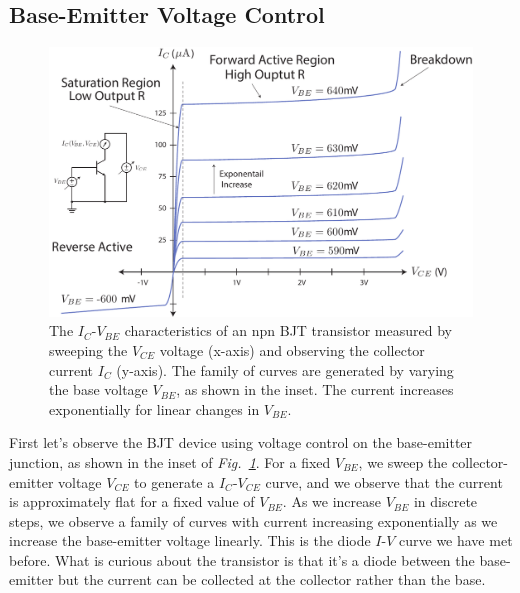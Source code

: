 \subsection{Base-Emitter Voltage Control}
\begin{figure}[tb]
\centering
\includegraphics[width=\columnwidth]{slide8_bjt_ic_vs_ve_curves}
\caption{The $I_C$-$V_{BE}$ characteristics of an npn BJT transistor measured by sweeping the $V_{CE}$ voltage (x-axis) and observing the collector current $I_C$ (y-axis).  The family of curves are generated by varying the base voltage $V_{BE}$, as shown in the inset.  The current increases exponentially for linear changes in $V_{BE}$.}
\label{fig:slide8_bjt_ic_vs_ve_curves}
\end{figure}
First let's observe the BJT device using voltage control on the base-emitter junction, as shown in the inset of \emph{Fig.~\ref{fig:slide8_bjt_ic_vs_ve_curves}}.  For a fixed $V_{BE}$, we sweep the collector-emitter voltage $V_{CE}$ to generate a $I_C$-$V_{CE}$ curve, and we observe that the current is approximately flat for a fixed value of $V_{BE}$.  As we increase $V_{BE}$ in discrete steps, we observe a family of curves with current increasing exponentially as we increase the base-emitter voltage linearly.  This is the diode $I$-$V$ curve we have met before.  What is curious about the transistor is that it's a diode between the base-emitter but the current can be collected at the collector rather than the base.
